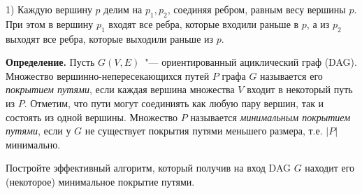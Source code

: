 \documentclass[12pt]{extreport}
\theoremstyle{definiton}
\theoremstyle{definition}
\theoremstyle{definition}
\newcounter{problem}
\newcounter{subproblem}
\def\beforPRskip{
	\bigskip
}
\def\prstar{\beforPRskip\noindent\stepcounter{problem}{\bf $\mathbf{\theproblem}^*$\negthickspace.}\setcounter{subproblem}{0}\;}
\begin{document}
	1) Каждую вершину $p$ делим на $p_1, p_2$, соединяя ребром, равным весу вершины $p$. При этом в вершину $p_1$ входят все ребра,
	которые входили раньше в $p$, а из $p_2$ выходят все ребра, которые выходили раньше из $p$.

\bigskip

\noindent\textbf{Определение.} Пусть $G(V,E)$~"--- ориентированный ациклический граф (DAG). Множество вершинно-непересекающихся путей $P$ графа $G$ называется его \emph{покрытием путями}, если каждая вершина множества $V$ входит в некоторый путь из $P$. Отметим, что пути могут соединиять как любую пару вершин, так и состоять из одной вершины. Множество $P$ называется \emph{минимальным покрытием путями}, если у $G$ не существует покрытия путями меньшего размера, т.е. $|P|$ минимально.

\prstar Постройте эффективный алгоритм, который получив на вход DAG $G$ находит его (некоторое) минимальное покрытие путями.
\end{document}
